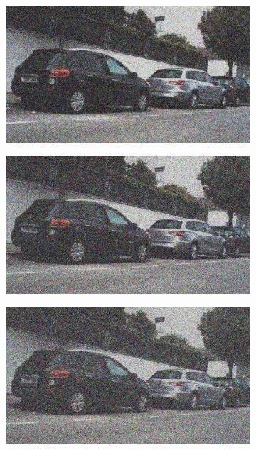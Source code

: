 \documentclass[a4paper]{ctexart}
\begin{document}
\begin{figure}[htbp]
\begin{subfigure}{0.08\textwidth}
			\label{fig：Gamma=0.4, Gauss Noise = 0.4}
		\end{subfigure}
		\begin{subfigure}{0.08\textwidth}
			\captionsetup{font=scriptsize}
			\includegraphics[width=\linewidth]{picture/Edge Detection/degrade/RGB_001 Gamma=0.4, Gauss Noise=0.5}
			\label{fig：Gamma=0.4, Gauss Noise = 0.5}
		\end{subfigure}
		\begin{subfigure}{0.08\textwidth}
			\captionsetup{font=scriptsize}
			\includegraphics[width=\linewidth]{picture/Edge Detection/degrade/RGB_001 Gamma=0.4, Gauss Noise=0.6}
			\label{fig：Gamma=0.4, Gauss Noise = 0.6}
		\end{subfigure}
		\begin{subfigure}{0.08\textwidth}
			\captionsetup{font=scriptsize}
			\includegraphics[width=\linewidth]{picture/Edge Detection/degrade/RGB_001 Gamma=0.4, Gauss Noise=0.7}

\end{subfigure}
\end{figure}
\end{document}
